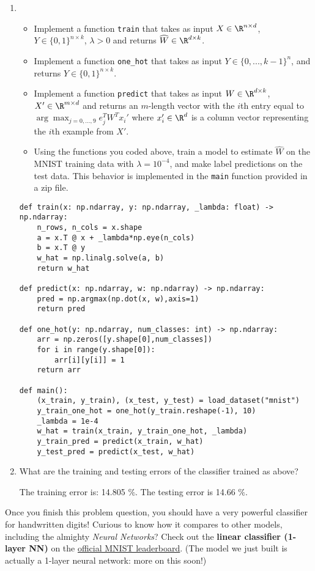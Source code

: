 \documentclass{article}
\begin{document}
\begin{aprob}
\begin{enumerate}
        \item {} 
        \begin{itemize}
            \item Implement a function \verb|train| that takes as input $X \in\R^{n \times d}$, $Y \in \{0,1\}^{n \times k}$, $\lambda > 0$ and returns $\widehat{W} \in \R^{d \times k}$.
            \item Implement a function \verb|one_hot| that takes as input $Y \in \{0, ..., k-1\}^{n}$, and returns $Y \in \{0,1\}^{n \times k}$.
            \item Implement a function  \verb|predict| that takes as input $W \in \R^{d \times k}$, $X' \in\R^{m \times d}$ and returns an $m$-length vector with the $i$th entry equal to $\arg\max_{j=0,\dots,9} e_j^T W^T x_i'$ where $x_i' \in \R^d$ is a column vector representing the $i$th example from $X'$.
            \item Using the functions you coded above, train a model to estimate $\widehat{W}$ on the MNIST training data with $\lambda = 10^{-4}$, and make label predictions on the test data. This behavior is implemented in the \verb|main| function provided in a zip file.
        \end{itemize}
        
        \begin{lstlisting}
def train(x: np.ndarray, y: np.ndarray, _lambda: float) -> np.ndarray:
    n_rows, n_cols = x.shape
    a = x.T @ x + _lambda*np.eye(n_cols)
    b = x.T @ y
    w_hat = np.linalg.solve(a, b) 
    return w_hat

def predict(x: np.ndarray, w: np.ndarray) -> np.ndarray:
    pred = np.argmax(np.dot(x, w),axis=1)
    return pred

def one_hot(y: np.ndarray, num_classes: int) -> np.ndarray:
    arr = np.zeros([y.shape[0],num_classes])
    for i in range(y.shape[0]):
        arr[i][y[i]] = 1
    return arr

def main():
    (x_train, y_train), (x_test, y_test) = load_dataset("mnist")
    y_train_one_hot = one_hot(y_train.reshape(-1), 10)
    _lambda = 1e-4
    w_hat = train(x_train, y_train_one_hot, _lambda)
    y_train_pred = predict(x_train, w_hat)
    y_test_pred = predict(x_test, w_hat)

        \end{lstlisting}
        
         \item {} What are the training and testing errors of the classifier trained as above?
         
         The training error is: 14.805 $\%$. The testing error is 14.66 $\%$.
         
    \end{enumerate}
    Once you finish this problem question, you should have a very powerful classifier for handwritten digits! Curious to know how it compares to other models, including the almighty \textit{Neural Networks}? Check out the \textbf{linear classifier (1-layer NN)} on the {\color{blue}\href{http://yann.lecun.com/exdb/mnist/}{official MNIST leaderboard}}. (The model we just built is actually a 1-layer neural network: more on this soon!)
\end{aprob}
\end{document}
